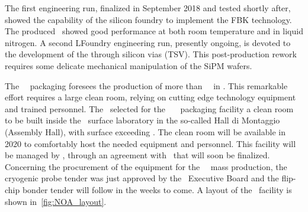 The first engineering run, finalized in September 2018 and tested shortly after, showed the capability of the silicon foundry to implement the FBK technology.  The produced \SiPMs\ showed good performance at both room temperature and in liquid nitrogen. A second LFoundry engineering run, presently ongoing, is devoted to the development of the through silicon vias (TSV). This post-production rework requires some delicate mechanical manipulation of the SiPM wafers.

The \DSks\ \SiPM\ packaging foresees the production of more than \DSkPdmsNumberWithSpares\ \DSkPdms\ in \DSkPdmsContructionTime. This remarkable effort requires a large clean room, relying on cutting edge technology equipment and trained personnel.  The \GADMC\ selected for the \NOA\ \DSks\ \SiPM\ packaging facility a clean room to be built inside the \LNGS\ surface laboratory in the so-called Hall di Montaggio (Assembly Hall), with surface exceeding \DSkPdmsCleanRoomSurface.  The clean room will be available in 2020 to comfortably host the needed equipment and personnel.  This facility will be managed by \GSSI, through an agreement with \INFN\ that will soon be finalized.  Concerning the procurement of the equipment for the \DSks\ \DSkPdms\ mass production, the cryogenic probe tender was just approved by the \INFN\ Executive Board and the flip-chip bonder tender will follow in the weeks to come. A layout of the \NOA\ facility is shown in~\ref{fig:NOA_layout}.

